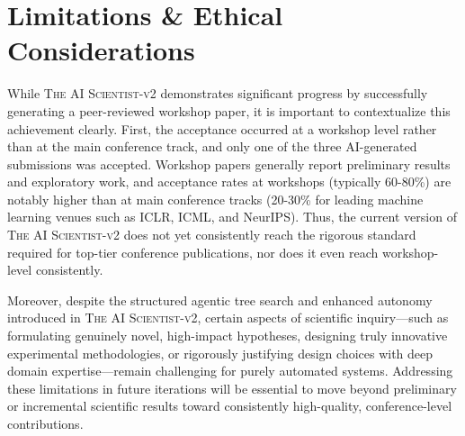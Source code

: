 \documentclass[11pt, a4paper]{include/gdm_format}
\newcommand{\ouralgo}{\textsc{The AI Scientist-v2}\xspace}
\begin{document}
\begin{tcolorbox}[colback=green!5!white, colframe=green!75!black, breakable, title={\small Reviewer \#2: Compositional Regularization: Unexpected Obstacles in Enhancing Neural Network Generalization}]
{\scriptsize }
\end{tcolorbox}

\section{Limitations \& Ethical Considerations}
\label{sec:limitations}

While \ouralgo demonstrates significant progress by successfully generating a peer-reviewed workshop paper, it is important to contextualize this achievement clearly. First, the acceptance occurred at a workshop level rather than at the main conference track, and only one of the three AI-generated submissions was accepted. Workshop papers generally report preliminary results and exploratory work, and acceptance rates at workshops (typically 60-80\%) are notably higher than at main conference tracks (20-30\% for leading machine learning venues such as ICLR, ICML, and NeurIPS). Thus, the current version of \ouralgo does not yet consistently reach the rigorous standard required for top-tier conference publications, nor does it even reach workshop-level consistently.

Moreover, despite the structured agentic tree search and enhanced autonomy introduced in \ouralgo, certain aspects of scientific inquiry---such as formulating genuinely novel, high-impact hypotheses, designing truly innovative experimental methodologies, or rigorously justifying design choices with deep domain expertise---remain challenging for purely automated systems.
Addressing these limitations in future iterations will be essential to move beyond preliminary or incremental scientific results toward consistently high-quality, conference-level contributions.
\end{document}
